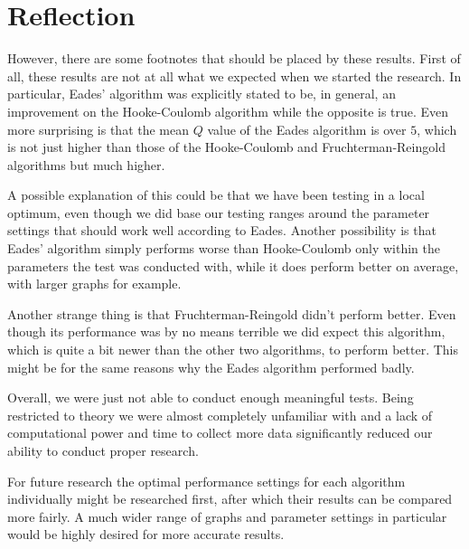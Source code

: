 \documentclass[a4paper,12pt]{article}
\begin{document}
  \section{Reflection}
  However, there are some footnotes that should be placed by these results.
  First of all, these results are not at all what we expected when we started the research. In particular, Eades' algorithm was explicitly stated to be, in general, an improvement on the Hooke-Coulomb algorithm while the opposite is true. Even more surprising is that the mean $Q$ value of the Eades algorithm is over $5$, which is not just higher than those of the Hooke-Coulomb and Fruchterman-Reingold algorithms but much higher.
  
  A possible explanation of this could be that we have been testing in a local optimum, even though we did base our testing ranges around the parameter settings that should work well according to Eades. Another possibility is that Eades' algorithm simply performs worse than Hooke-Coulomb only within the parameters the test was conducted with, while it does perform better on average, with larger graphs for example.
  
  Another strange thing is that Fruchterman-Reingold didn't perform better. Even though its performance was by no means terrible we did expect this algorithm, which is quite a bit newer than the other two algorithms, to perform better. This might be for the same reasons why the Eades algorithm performed badly.
  
  Overall, we were just not able to conduct enough meaningful tests. Being restricted to theory we were almost completely unfamiliar with and a lack of computational power and time to collect more data significantly reduced our ability to conduct proper research.
  
  For future research the optimal performance settings for each algorithm individually might be researched first, after which their results can be compared more fairly. A much wider range of graphs and parameter settings in particular would be highly desired for more accurate results.

  {}
  
\end{document}
